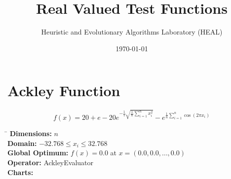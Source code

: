 \documentclass[12pt, a4paper]{article}
\title{Real Valued Test Functions}
\author{Heuristic and Evolutionary Algorithms Laboratory (HEAL)}
\date{\today}
\begin{document}
	\maketitle

	\section*{Ackley Function}
		\begin{equation*}
			f(x) = 20 + e - 20e^{-\frac{1}{5} \sqrt{\frac{1}{n} \sum_{i=1}^n x_i^2}} - e^{\frac{1}{n} \sum_{i=1}^n \cos(2 \pi x_i)}
		\end{equation*}

		\begin{tabbing}
			\hspace{5cm}\=\kill
			\textbf{Dimensions:}     \> $n$ \\
			\textbf{Domain:}         \> $-32.768 \leq x_i \leq 32.768$ \\
			\textbf{Global Optimum:} \> $f(x) = 0.0$ at $x = (0.0, 0.0, \dots, 0.0)$ \\
			\textbf{Operator:}       \> AckleyEvaluator \\
			\textbf{Charts:}         \> \\
		\end{tabbing}
\end{document}
